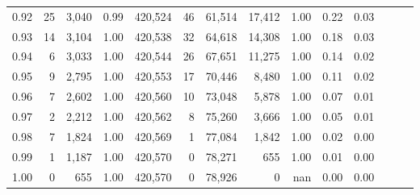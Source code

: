 \begin{tabular}{rrrrrrrrrrrrrr}
0.92 &     25 &  3,040 &  0.99 &  420,524 &       46 &  61,514 &  17,412 &  1.00 &  0.22 &      0.03 \\
0.93 &     14 &  3,104 &  1.00 &  420,538 &       32 &  64,618 &  14,308 &  1.00 &  0.18 &      0.03 \\
0.94 &      6 &  3,033 &  1.00 &  420,544 &       26 &  67,651 &  11,275 &  1.00 &  0.14 &      0.02 \\
0.95 &      9 &  2,795 &  1.00 &  420,553 &       17 &  70,446 &   8,480 &  1.00 &  0.11 &      0.02 \\
0.96 &      7 &  2,602 &  1.00 &  420,560 &       10 &  73,048 &   5,878 &  1.00 &  0.07 &      0.01 \\
0.97 &      2 &  2,212 &  1.00 &  420,562 &        8 &  75,260 &   3,666 &  1.00 &  0.05 &      0.01 \\
0.98 &      7 &  1,824 &  1.00 &  420,569 &        1 &  77,084 &   1,842 &  1.00 &  0.02 &      0.00 \\
0.99 &      1 &  1,187 &  1.00 &  420,570 &        0 &  78,271 &     655 &  1.00 &  0.01 &      0.00 \\
1.00 &      0 &    655 &  1.00 &  420,570 &        0 &  78,926 &       0 &   nan &  0.00 &      0.00 \\
\bottomrule
\end{tabular}
